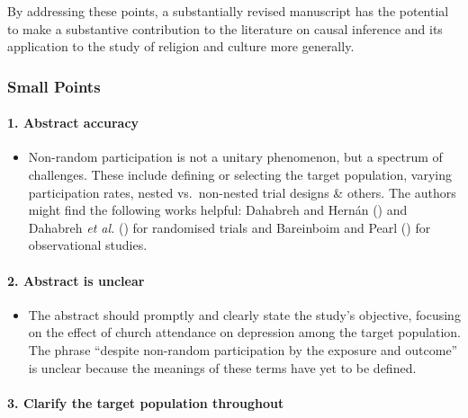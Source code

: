 \documentclass[
  singlecolumn]{article}
\let\oldparagraph\paragraph
\renewcommand{\paragraph}[1]{\oldparagraph{#1}\mbox{}}
\providecommand{\tightlist}{%
  \setlength{\itemsep}{0pt}\setlength{\parskip}{0pt}}\usepackage{longtable,booktabs,array}
\begin{document}
By addressing these points, a substantially revised manuscript has the
potential to make a substantive contribution to the literature on causal
inference and its application to the study of religion and culture more
generally.

\subsubsection{Small Points}\label{small-points}

\paragraph{1. Abstract accuracy}\label{abstract-accuracy}

\begin{itemize}
\tightlist
\item
  Non-random participation is not a unitary phenomenon, but a spectrum
  of challenges. These include defining or selecting the target
  population, varying participation rates, nested vs.~non-nested trial
  designs \& others. The authors might find the following works helpful:
  Dahabreh and Hernán () and Dahabreh
  \emph{et al.} () for randomised
  trials and Bareinboim and Pearl
  () for observational
  studies.
\end{itemize}

\paragraph{2. Abstract is unclear}\label{abstract-is-unclear}

\begin{itemize}
\tightlist
\item
  The abstract should promptly and clearly state the study's objective,
  focusing on the effect of church attendance on depression among the
  target population. The phrase ``despite non-random participation by
  the exposure and outcome'' is unclear because the meanings of these
  terms have yet to be defined.
\end{itemize}

\paragraph{3. Clarify the target population
throughout}\label{clarify-the-target-population-throughout}
\end{document}
